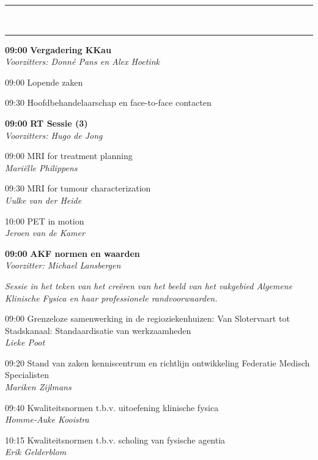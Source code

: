 \documentclass[a4paper,10pt]{report}
\begin{document}
\begin{multicols*}{3}
\vfill
\hrule\vspace{3mm}
\\
\hrule
\vfill

\begin{packed_enum}
\item[\textbf{09:00}] \textbf{Vergadering KKau}\\\textit{Voorzitters: Donn\'e Pans en Alex Hoetink}
\item[09:00] Lopende zaken
\item[09:30] Hoofdbehandelaarschap en face-to-face contacten 
\end{packed_enum}
\columnbreak

\begin{packed_enum}
\item[\textbf{09:00}] \textbf{RT Sessie (3)}\\\textit{Voorzitters: Hugo de Jong}
\item[09:00] MRI for treatment planning\\\textit{Mariëlle Philippens}
\item[09:30] MRI for tumour characterization\\\textit{Uulke van der Heide}
\item[10:00] PET in motion\\\textit{Jeroen van de Kamer}
\end{packed_enum}

\vfill
{}
\begin{packed_enum}
\item[\textbf{09:00}] \textbf{AKF normen en waarden}\\\textit{Voorzitter: Michael Lansbergen}
\end{packed_enum}
\textit{Sessie in het teken van het cre\"eren van het beeld van het vakgebied Algemene Klinische Fysica en haar professionele randvoorwaarden.}
\begin{packed_enum}
\item[09:00] Grenzeloze samenwerking in de regioziekenhuizen: Van Slotervaart tot Stadskanaal: Standaardisatie van werkzaamheden\\\textit{Lieke Poot}
\item[09:20] Stand van zaken kenniscentrum en richtlijn ontwikkeling Federatie Medisch Specialisten\\\textit{Mariken Zijlmans}
\item[09:40] Kwaliteitsnormen t\@.b\@.v\@. uitoefening klinische fysica\\\textit{Homme-Auke Kooistra} 
\item[10:15] Kwaliteitsnormen t\@.b\@.v\@. scholing van fysische agentia\\\textit{Erik Gelderblom}
\end{packed_enum}


\end{multicols*}
\end{document}
